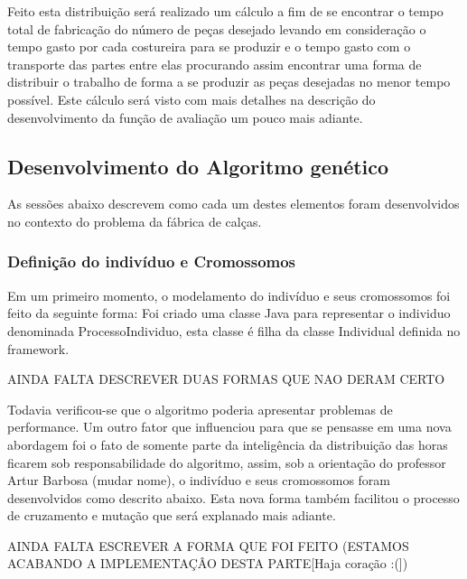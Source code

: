 Feito esta distribuição será realizado um cálculo a fim de se encontrar o tempo total de fabricação do número de peças
desejado levando em consideração o tempo gasto por cada costureira para se produzir e o tempo gasto com o transporte 
das partes entre elas procurando assim encontrar uma forma de distribuir o trabalho de forma a se produzir as peças 
desejadas no menor tempo possível. Este cálculo será visto com mais detalhes na descrição do desenvolvimento da função 
de avaliação um pouco mais adiante.











\subsection{Desenvolvimento do Algoritmo genético}

\par 
As sessões abaixo descrevem como cada um destes elementos foram desenvolvidos no contexto do problema da fábrica de calças.




\subsubsection{Definição do indivíduo e Cromossomos}



\par Em um primeiro momento, o modelamento do indivíduo e seus cromossomos foi feito da seguinte forma:
Foi criado uma classe Java para representar o individuo denominada ProcessoIndividuo, esta classe é filha 
da classe Individual definida no framework. 

AINDA FALTA DESCREVER DUAS FORMAS QUE NAO DERAM CERTO


Todavia verificou-se que o algoritmo poderia apresentar problemas de performance. Um outro fator que 
influenciou para que se pensasse em uma nova abordagem foi o fato de somente parte da inteligência da distribuição
das horas ficarem sob responsabilidade do algoritmo, assim, sob a orientação do professor Artur Barbosa (mudar nome), 
o indivíduo e seus cromossomos foram desenvolvidos como descrito abaixo. Esta nova forma também facilitou o processo 
de cruzamento e mutação que será explanado mais adiante.

AINDA FALTA ESCREVER A FORMA QUE FOI FEITO (ESTAMOS ACABANDO A IMPLEMENTAÇÂO DESTA PARTE[Haja coração :(])

